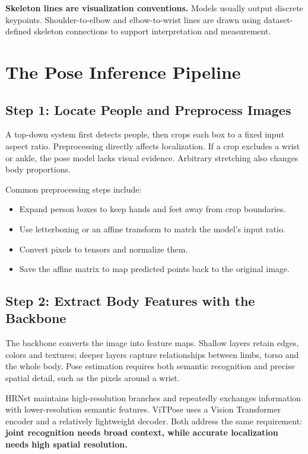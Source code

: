 \documentclass[11pt,a4paper,oneside]{report}
\begin{document}
\begin{plainBox}
\textbf{Skeleton lines are visualization conventions.}\quad
Models usually output discrete keypoints. Shoulder-to-elbow and elbow-to-wrist lines are drawn using dataset-defined skeleton connections to support interpretation and measurement.
\end{plainBox}

\section{The Pose Inference Pipeline}

\subsection{Step 1: Locate People and Preprocess Images}

A top-down system first detects people, then crops each box to a fixed input aspect ratio. Preprocessing directly affects localization. If a crop excludes a wrist or ankle, the pose model lacks visual evidence. Arbitrary stretching also changes body proportions.

Common preprocessing steps include:
\begin{itemize}
  \item Expand person boxes to keep hands and feet away from crop boundaries.
  \item Use letterboxing or an affine transform to match the model's input ratio.
  \item Convert pixels to tensors and normalize them.
  \item Save the affine matrix to map predicted points back to the original image.
\end{itemize}

\subsection{Step 2: Extract Body Features with the Backbone}

The backbone converts the image into feature maps. Shallow layers retain edges, colors and textures; deeper layers capture relationships between limbs, torso and the whole body. Pose estimation requires both semantic recognition and precise spatial detail, such as the pixels around a wrist.

HRNet maintains high-resolution branches and repeatedly exchanges information with lower-resolution semantic features. ViTPose uses a Vision Transformer encoder and a relatively lightweight decoder. Both address the same requirement: \textbf{joint recognition needs broad context, while accurate localization needs high spatial resolution.}
\end{document}
